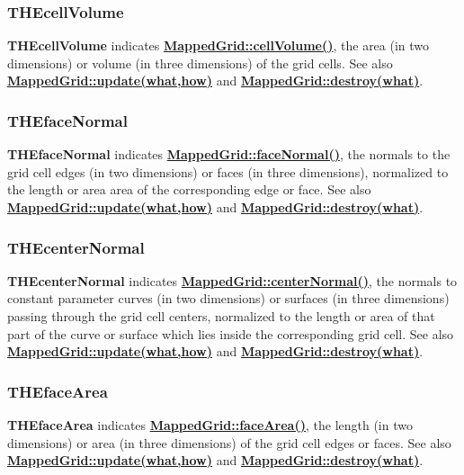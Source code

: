 \documentclass{article}
\begin{document}
  \subsubsection{THEcellVolume}
  \label{MappedGrid::THEcellVolume}
    \textbf{THEcellVolume} indicates {\bf{}\hyperref{cellVolume()}{cellVolume() \rm(\S}{)}{MappedGrid::cellVolume()}},
    the area (in two dimensions) or volume (in three dimensions) of the grid cells.
    See also {\bf{}\hyperref{update(what,how)}{update(what,how) \rm(\S}{)}{MappedGrid::update(what,how)}}
    and {\bf{}\hyperref{destroy(what)}{destroy(what) \rm(\S}{)}{MappedGrid::destroy(what)}}.

  \subsubsection{THEfaceNormal}
  \label{MappedGrid::THEfaceNormal}
    \textbf{THEfaceNormal} indicates {\bf{}\hyperref{faceNormal()}{faceNormal() \rm(\S}{)}{MappedGrid::faceNormal()}},
    the normals to the grid cell edges (in two dimensions) or faces (in three dimensions),
    normalized to the length or area area of the corresponding edge or face.
    See also {\bf{}\hyperref{update(what,how)}{update(what,how) \rm(\S}{)}{MappedGrid::update(what,how)}}
    and {\bf{}\hyperref{destroy(what)}{destroy(what) \rm(\S}{)}{MappedGrid::destroy(what)}}.

  \subsubsection{THEcenterNormal}
  \label{MappedGrid::THEcenterNormal}
    \textbf{THEcenterNormal} indicates {\bf{}\hyperref{centerNormal()}{centerNormal() \rm(\S}{)}{MappedGrid::centerNormal()}},
    the normals to constant parameter curves (in two dimensions) or surfaces (in three dimensions)
    passing through the grid cell centers, normalized
    to the length or area of that part of the curve or surface which lies inside the corresponding grid cell.
    See also {\bf{}\hyperref{update(what,how)}{update(what,how) \rm(\S}{)}{MappedGrid::update(what,how)}}
    and {\bf{}\hyperref{destroy(what)}{destroy(what) \rm(\S}{)}{MappedGrid::destroy(what)}}.

  \subsubsection{THEfaceArea}
  \label{MappedGrid::THEfaceArea}
    \textbf{THEfaceArea} indicates {\bf{}\hyperref{faceArea()}{faceArea() \rm(\S}{)}{MappedGrid::faceArea()}},
    the length (in two dimensions) or area (in three dimensions) of the grid cell edges or faces.
    See also {\bf{}\hyperref{update(what,how)}{update(what,how) \rm(\S}{)}{MappedGrid::update(what,how)}}
    and {\bf{}\hyperref{destroy(what)}{destroy(what) \rm(\S}{)}{MappedGrid::destroy(what)}}.
\end{document}
